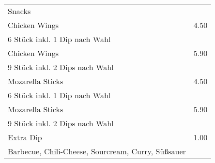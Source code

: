 \documentclass[12pt]{article}
\makeatletter
\newcommand*\ColText[1]{\textcolor{Goldenrod3}{#1}}
\newenvironment{Group}[1]
{\noindent\begin{tabular*}{\textwidth}{@{}p{.8\linewidth}@{\extracolsep{\fill}}r@{}}
{\fontsize{24}{29}\selectfont\ColText{#1}}\\[0.8em]}
{\end{tabular*}}
\newcommand*\Entry[2]{%
    \sffamily#1 & #2}
\newcommand*\Expl[1]{%
    \hspace*{1em}\footnotesize #1}
\makeatother
\begin{document}
    \begin{Group}{Snacks}
        \Entry{Chicken Wings}{4.50} \\
        \Expl{6 Stück inkl. 1 Dip nach Wahl} \\
        \Entry{Chicken Wings}{5.90} \\
        \Expl{9 Stück inkl. 2 Dips nach Wahl} \\
        \Entry{Mozarella Sticks}{4.50} \\
        \Expl{6 Stück inkl. 1 Dip nach Wahl} \\
        \Entry{Mozarella Sticks}{5.90} \\
        \Expl{9 Stück inkl. 2 Dips nach Wahl} \\
        \Entry{Extra Dip}{1.00} \\
        \Expl{Barbecue, Chili-Cheese, Sourcream, Curry, Süßsauer} \\
    \end{Group}

    \vfill
\end{document}
